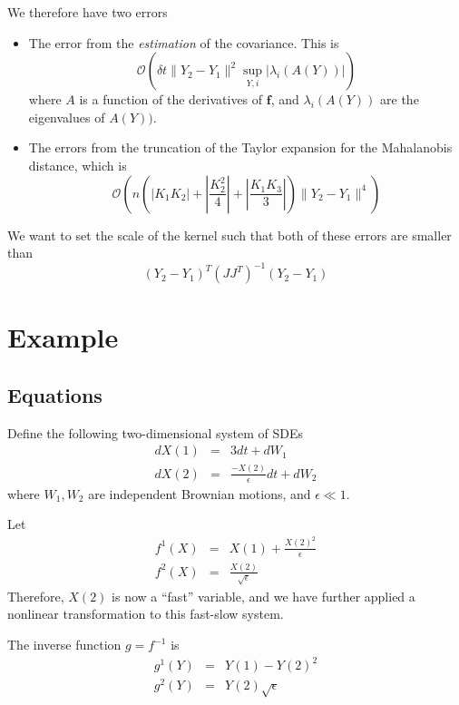 \documentclass[12pt]{article}
\begin{document}
We therefore have two errors
\begin{itemize}
\item The error from the {\em estimation} of the covariance.
%
This is
$$\mathcal{O} \left( \delta t \| Y_2 - Y_1 \|^2 \sup_{Y, i} |\lambda_i(A(Y))| \right)$$
%
where $A$ is a function of the derivatives of $\mathbf{f}$, and $\lambda_i(A(Y))$ are the eigenvalues of $A(Y))$.

\item The errors from the truncation of the Taylor expansion for the Mahalanobis distance, which is 
$$\mathcal{O} \left(  n \left( \left| K_1 K_2 \right| + \left| \frac{ K_2^2}{4} \right|  + \left| \frac{K_1 K_3}{3} \right|  \right) \| Y_2 - Y_1 \| ^4  \right)$$
\end{itemize}

We want to set the scale of the kernel such that both of these errors are smaller than
\begin{equation}
(Y_2 - Y_1)^T (JJ^T)^{-1} (Y_2 - Y_1) 
\end{equation}

\section{Example}

\subsection{Equations}

Define the following two-dimensional system of SDEs
\begin{eqnarray}
dX(1) &=& 3 dt + dW_1 \\ 
dX(2) &=& \frac{-X(2)}{\epsilon} dt + dW_2 
\end{eqnarray}
where $W_1, W_2$ are independent Brownian motions, and $\epsilon \ll 1$.

Let
\begin{eqnarray}
f^1(X) &=& X(1) + \frac{ X(2)^2}{\epsilon} \\
f^2(X) &=& \frac{X(2)}{\sqrt{\epsilon}}
\end{eqnarray}
Therefore, $X(2)$ is now a ``fast'' variable, and we have further applied a nonlinear transformation to this fast-slow system. 

The inverse function $g = f^{-1}$ is
\begin{eqnarray}
g^1(Y) &=& Y(1) - Y(2)^2 \\
g^2(Y) &=& Y(2) \sqrt{\epsilon}
\end{eqnarray}
\end{document}
